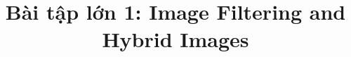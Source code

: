 %
%
%
%
%
%
%
%
%
%
%
%
%

\documentclass[11pt]{article}
\usepackage{vntex}
\usepackage[english]{babel}
\usepackage[utf8]{inputenc}
\usepackage[colorlinks = true,
            linkcolor = blue,
            urlcolor  = blue]{hyperref}
\usepackage[a4paper,margin=1.5in]{geometry}
\usepackage{stackengine,graphicx}
\usepackage{fancyhdr}
\setlength{\headheight}{15pt}
\usepackage{microtype}
\usepackage{times}
\usepackage{booktabs}
\usepackage{gensymb}
\usepackage{amsmath}
\usepackage{float}


\usepackage{pythonhighlight}

\frenchspacing
\setlength{\parindent}{0cm} %
\setlength{\parskip}{0.3cm plus1mm minus1mm}

\pagestyle{fancy}
\fancyhf{}
\rfoot{\thepage}

\date{}

\title{\vspace{-1cm}Bài tập lớn 1: Image Filtering and Hybrid Images}



\maketitle
\vspace{-2cm}
\thispagestyle{fancy}

